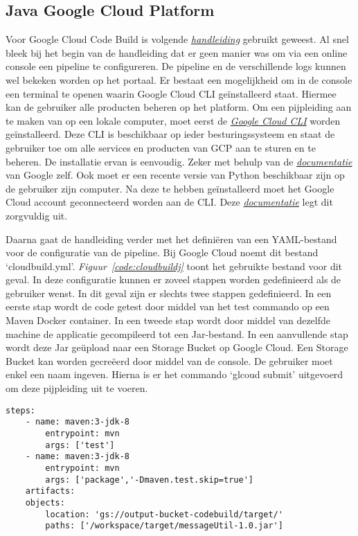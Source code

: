 \subsection{Java Google Cloud Platform}
\label{sec:JGCP}
Voor Google Cloud Code Build is volgende \emph{\href{https://cloud.google.com/cloud-build/docs/building/build-java}{handleiding} }gebruikt geweest. Al snel bleek bij het begin van de handleiding dat er geen manier was om via een online console een pipeline te configureren. De pipeline en de verschillende logs kunnen wel bekeken worden op het portaal. Er bestaat een mogelijkheid om in de console een terminal te openen waarin Google Cloud CLI geïnstalleerd staat. Hiermee kan de gebruiker alle producten beheren op het platform. Om een pijpleiding aan te maken van op een lokale computer, moet eerst de \emph{\href{https://cloud.google.com/sdk?hl=nl}{Google Cloud CLI}} worden geïnstalleerd. Deze CLI is beschikbaar op ieder besturingssysteem en staat de gebruiker toe om alle services en producten van GCP aan te sturen en te beheren. De installatie ervan is eenvoudig. Zeker met behulp van de \emph{\href{https://cloud.google.com/sdk/docs/downloads-versioned-archives?hl=nl}{documentatie}} van Google zelf. Ook moet er een recente versie van Python beschikbaar zijn op de gebruiker zijn computer. Na deze te hebben geïnstalleerd  moet het Google Cloud account geconnecteerd worden aan de CLI. Deze \emph{\href{https://cloud.google.com/sdk/docs/initializing?hl=nl}{documentatie}} legt dit zorgvuldig uit.

Daarna gaat de handleiding verder met het definiëren van een YAML-bestand voor de configuratie van de pipeline. Bij Google Cloud noemt dit bestand ‘cloudbuild.yml’. \emph{Figuur~\ref{code:cloudbuildj}} toont het gebruikte bestand voor dit geval. In deze configuratie kunnen er zoveel stappen worden gedefinieerd als de gebruiker wenst. In dit geval zijn er slechts twee stappen gedefinieerd. In een eerste stap wordt de code getest door middel van het test commando op een Maven Docker container. In een tweede stap wordt door middel van dezelfde machine de applicatie gecompileerd tot een Jar-bestand. In een aanvullende stap wordt deze Jar geüpload naar een Storage Bucket op Google Cloud. Een Storage Bucket kan worden gecreëerd door middel van de console. De gebruiker moet enkel een naam ingeven. Hierna is er het commando ‘glcoud submit’ uitgevoerd om deze pijpleiding uit te voeren. 

\begin{lstlisting}
steps:
    - name: maven:3-jdk-8
        entrypoint: mvn
        args: ['test']
    - name: maven:3-jdk-8
        entrypoint: mvn
        args: ['package','-Dmaven.test.skip=true']
    artifacts:
    objects:
        location: 'gs://output-bucket-codebuild/target/'
        paths: ['/workspace/target/messageUtil-1.0.jar']
\end{lstlisting}

